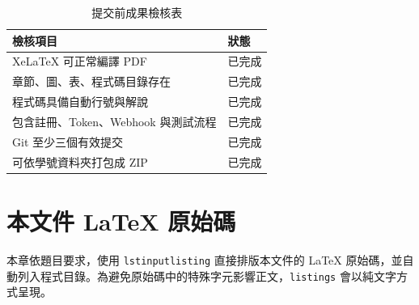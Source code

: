 \documentclass[12pt,a4paper]{report}
\begin{document}
\begin{table}[htbp]
\centering
\caption{提交前成果檢核表}
\label{tab:checklist}
\begin{tabular}{p{7cm}p{4cm}}
\toprule
檢核項目 & 狀態 \\
\midrule
XeLaTeX 可正常編譯 PDF & 已完成 \\
章節、圖、表、程式碼目錄存在 & 已完成 \\
程式碼具備自動行號與解說 & 已完成 \\
包含註冊、Token、Webhook 與測試流程 & 已完成 \\
Git 至少三個有效提交 & 已完成 \\
可依學號資料夾打包成 ZIP & 已完成 \\
\bottomrule
\end{tabular}
\end{table}

\chapter{本文件 LaTeX 原始碼}
本章依題目要求，使用 \texttt{lstinputlisting} 直接排版本文件的 LaTeX 原始碼，並自動列入程式目錄。為避免原始碼中的特殊字元影響正文，\texttt{listings} 會以純文字方式呈現。

\end{document}
